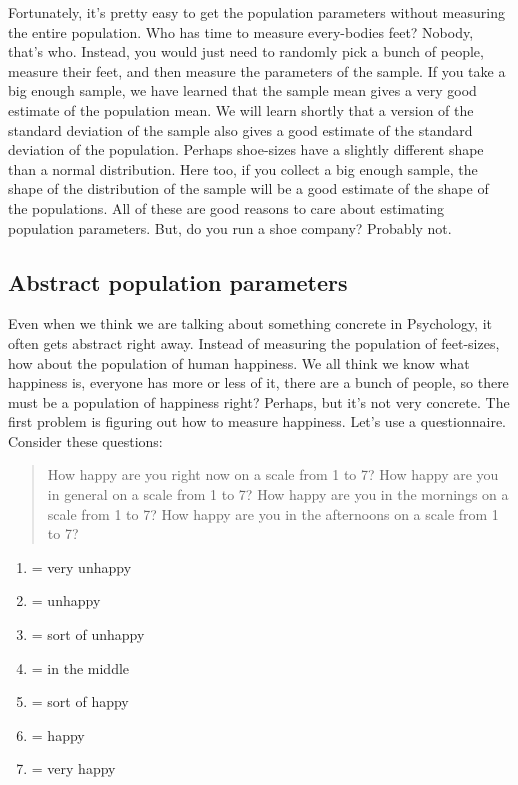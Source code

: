 \documentclass[
]{book}
\providecommand{\tightlist}{%
  \setlength{\itemsep}{0pt}\setlength{\parskip}{0pt}}
\begin{document}
Fortunately, it's pretty easy to get the population parameters without measuring the entire population. Who has time to measure every-bodies feet? Nobody, that's who. Instead, you would just need to randomly pick a bunch of people, measure their feet, and then measure the parameters of the sample. If you take a big enough sample, we have learned that the sample mean gives a very good estimate of the population mean. We will learn shortly that a version of the standard deviation of the sample also gives a good estimate of the standard deviation of the population. Perhaps shoe-sizes have a slightly different shape than a normal distribution. Here too, if you collect a big enough sample, the shape of the distribution of the sample will be a good estimate of the shape of the populations. All of these are good reasons to care about estimating population parameters. But, do you run a shoe company? Probably not.

\hypertarget{abstract-population-parameters}{%
\subsection{Abstract population parameters}\label{abstract-population-parameters}}

Even when we think we are talking about something concrete in Psychology, it often gets abstract right away. Instead of measuring the population of feet-sizes, how about the population of human happiness. We all think we know what happiness is, everyone has more or less of it, there are a bunch of people, so there must be a population of happiness right? Perhaps, but it's not very concrete. The first problem is figuring out how to measure happiness. Let's use a questionnaire. Consider these questions:

\begin{quote}
How happy are you right now on a scale from 1 to 7?
How happy are you in general on a scale from 1 to 7?
How happy are you in the mornings on a scale from 1 to 7?
How happy are you in the afternoons on a scale from 1 to 7?
\end{quote}

\begin{enumerate}
\def\labelenumi{\arabic{enumi}.}
\tightlist
\item
  = very unhappy
\item
  = unhappy
\item
  = sort of unhappy
\item
  = in the middle
\item
  = sort of happy
\item
  = happy
\item
  = very happy
\end{enumerate}
\end{document}
